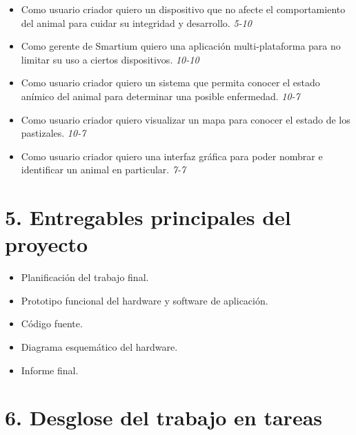 \documentclass[11pt]{charter}
\begin{document}
\begin{itemize}
\item Como usuario criador quiero un dispositivo que no afecte el comportamiento del animal para cuidar su integridad y desarrollo. \textit{5-10}
\item Como gerente de Smartium quiero una aplicación multi-plataforma para no limitar su uso a ciertos dispositivos. \textit{10-10}
\item Como usuario criador quiero un sistema que permita conocer el estado anímico del animal para determinar una posible enfermedad. \textit{10-7}
\item Como usuario criador quiero visualizar un mapa para conocer el estado de los pastizales. \textit{10-7}
\item Como usuario criador quiero una interfaz gráfica para poder nombrar e identificar un animal en particular. \textit{7-7}   
\end{itemize}

\section{5. Entregables principales del proyecto}
\label{sec:entregables}


\begin{itemize}
\item Planificación del trabajo final.
\item Prototipo funcional del hardware y software de aplicación.
\item Código fuente.
\item Diagrama esquemático del hardware.
\item Informe final.

\end{itemize}

\section{6. Desglose del trabajo en tareas}
\label{sec:wbs}
\end{document}
